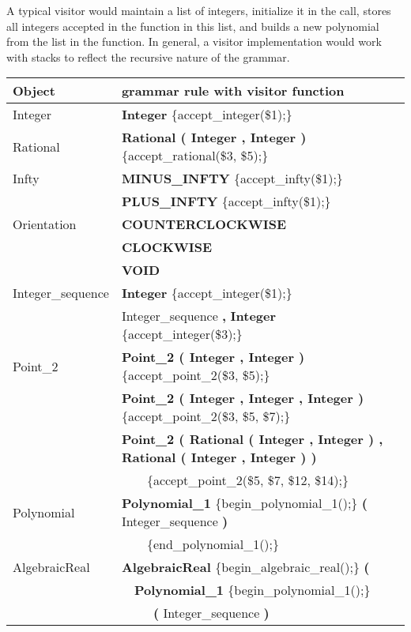 A typical visitor would maintain a list of integers, initialize
it in the  call, stores all integers
accepted in the  function in this list,
and builds a new polynomial from the list in the
 function. In general, a visitor
implementation would work with stacks to reflect the recursive nature
of the grammar.

\begin{tabular}{*{2}{| l} |} \hline
Object   & grammar rule with visitor function          \\ \hline \hline
Integer  & {\bf Integer} \{accept\_integer(\$1);\}  \\ \hline
Rational & {\bf Rational ( Integer , Integer )} \{accept\_rational(\$3, \$5);\} \\ \hline
Infty    & {\bf MINUS\_INFTY} \{accept\_infty(\$1);\}  \\ 
         & {\bf PLUS\_INFTY} \{accept\_infty(\$1);\}  \\ \hline
Orientation  & {\bf COUNTERCLOCKWISE} \\
             & {\bf CLOCKWISE} \\
             & {\bf VOID}          \\ \hline
Integer\_sequence &  {\bf Integer} \{accept\_integer(\$1);\} \\
                 & Integer\_sequence {\bf \Large ,} {\bf Integer} \{accept\_integer(\$3);\} \\ \hline
Point\_2 & {\bf Point\_2 ( Integer , Integer )} \{accept\_point\_2(\$3, \$5);\} \\ 
         & {\bf Point\_2 ( Integer , Integer , Integer )} \{accept\_point\_2(\$3, \$5, \$7);\} \\
         & {\bf Point\_2 ( Rational ( Integer , Integer ) , Rational ( Integer , Integer ) )} \\
         & \ \ \ \ \{accept\_point\_2(\$5, \$7, \$12, \$14);\} \\ \hline
Polynomial &  {\bf Polynomial\_1} \{begin\_polynomial\_1();\} {\bf \Large (} Integer\_sequence {\bf \Large )} \\
           &\ \ \ \ \{end\_polynomial\_1();\} \\ \hline
AlgebraicReal & {\bf AlgebraicReal} \{begin\_algebraic\_real();\} {\bf \Large (}         \\
              & \ \ {\bf Polynomial\_1} \{begin\_polynomial\_1();\}\\
              & \ \ \ \ \ {\bf \Large (} Integer\_sequence {\bf \Large )}\\

\end{tabular}
